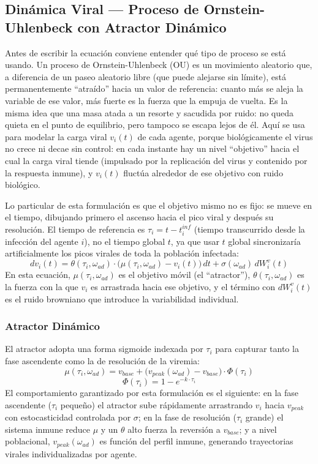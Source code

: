 \documentclass[conference]{IEEEtran}
\begin{document}
\subsection{Dinámica Viral --- Proceso de Ornstein-Uhlenbeck con Atractor Dinámico}
Antes de escribir la ecuación conviene entender qué tipo de proceso se está usando. Un proceso de Ornstein-Uhlenbeck (OU) es un movimiento aleatorio que, a diferencia de un paseo aleatorio libre (que puede alejarse sin límite), está permanentemente ``atraído'' hacia un valor de referencia: cuanto más se aleja la variable de ese valor, más fuerte es la fuerza que la empuja de vuelta. Es la misma idea que una masa atada a un resorte y sacudida por ruido: no queda quieta en el punto de equilibrio, pero tampoco se escapa lejos de él. Aquí se usa para modelar la carga viral $v_i(t)$ de cada agente, porque biológicamente el virus no crece ni decae sin control: en cada instante hay un nivel ``objetivo'' hacia el cual la carga viral tiende (impulsado por la replicación del virus y contenido por la respuesta inmune), y $v_i(t)$ fluctúa alrededor de ese objetivo con ruido biológico.

Lo particular de esta formulación es que el objetivo mismo no es fijo: se mueve en el tiempo, dibujando primero el ascenso hacia el pico viral y después su resolución. El tiempo de referencia es $\tau_i = t - t_i^{inf}$ (tiempo transcurrido desde la infección del agente $i$), no el tiempo global $t$, ya que usar $t$ global sincronizaría artificialmente los picos virales de toda la población infectada:
\begin{equation}
dv_i(t) = \theta(\tau_i, \omega_{ad}) \cdot \bigl(\mu(\tau_i, \omega_{ad}) - v_i(t)\bigr)\, dt + \sigma(\omega_{ad})\, dW_i^v(t)
\end{equation}
En esta ecuación, $\mu(\tau_i,\omega_{ad})$ es el objetivo móvil (el ``atractor''), $\theta(\tau_i,\omega_{ad})$ es la fuerza con la que $v_i$ es arrastrada hacia ese objetivo, y el término con $dW_i^v(t)$ es el ruido browniano que introduce la variabilidad individual.

\subsubsection{Atractor Dinámico}
El atractor adopta una forma sigmoide indexada por $\tau_i$ para capturar tanto la fase ascendente como la de resolución de la viremia:
\begin{equation}
\mu(\tau_i, \omega_{ad}) = v_{base} + \bigl(v_{peak}(\omega_{ad}) - v_{base}\bigr) \cdot \Phi(\tau_i)
\end{equation}
\begin{equation}
\Phi(\tau_i) = 1 - e^{-k \cdot \tau_i}
\end{equation}
El comportamiento garantizado por esta formulación es el siguiente: en la fase ascendente ($\tau_i$ pequeño) el atractor sube rápidamente arrastrando $v_i$ hacia $v_{peak}$ con estocasticidad controlada por $\sigma$; en la fase de resolución ($\tau_i$ grande) el sistema inmune reduce $\mu$ y un $\theta$ alto fuerza la reversión a $v_{base}$; y a nivel poblacional, $v_{peak}(\omega_{ad})$ es función del perfil inmune, generando trayectorias virales individualizadas por agente.
\end{document}
